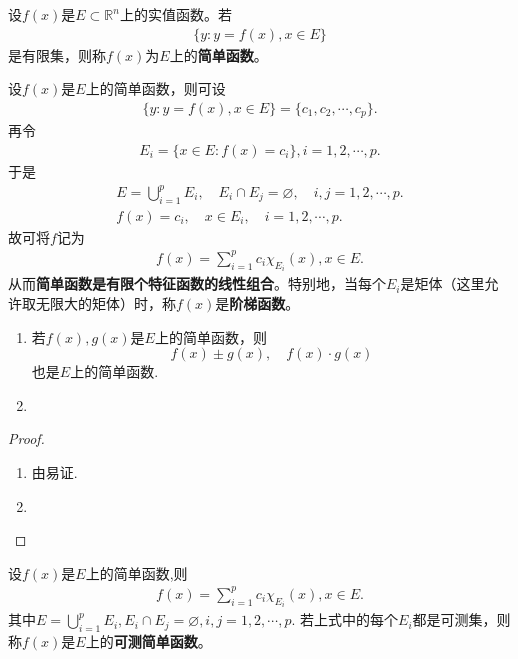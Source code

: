 \documentclass[../../main.tex]{subfiles}
\begin{document}
\begin{definition}[简单函数]
设$f(x)$是$E \subset \mathbb{R}^n$上的实值函数。若
\begin{align*}
\{y: y = f(x), x \in E\}
\end{align*}
是有限集，则称$f(x)$为$E$上的\textbf{简单函数}。
\end{definition}

\begin{theorem}\label{theorem:简单函数是有限个特征函数的线性组合}
设$f(x)$是$E$上的简单函数，则可设
\begin{align*}
\{y:y=f(x),x\in E\}=\{c_1,c_2,\cdots,c_p\}.
\end{align*}
再令
\begin{align*}
E_i=\{x\in E:f(x)=c_i\},i=1,2,\cdots,p.
\end{align*}
于是
\begin{gather*}
E = \bigcup_{i = 1}^{p} E_i, \quad E_i \cap E_j = \varnothing, \quad i, j = 1, 2, \cdots, p. \\
f(x) = c_i, \quad x \in E_i,\quad i = 1, 2, \cdots, p.
\end{gather*}
故可将$f$记为
\begin{align*}
f(x) = \sum_{i = 1}^{p} c_i \chi_{E_i}(x),x \in E.
\end{align*}
从而\textbf{简单函数是有限个特征函数的线性组合}。特别地，当每个$E_i$是矩体（这里允许取无限大的矩体）时，称$f(x)$是\textbf{阶梯函数}。 
\end{theorem}

\begin{proposition}\label{proposition:简单函数的性质}
\begin{enumerate}
\item 若$f(x),g(x)$是$E$上的简单函数，则$$f(x) \pm g(x),\quad f(x) \cdot g(x)$$
也是$E$上的简单函数.

\item 
\end{enumerate}
\end{proposition}
\begin{proof}
\begin{enumerate}
\item 由易证.

\item 
\end{enumerate}
\end{proof}

\begin{definition}[可测简单函数]
设$f(x)$是$E$上的简单函数,则
\begin{align*}
f(x)= \sum_{i = 1}^{p} c_i \chi_{E_i}(x),x \in E.
\end{align*}
其中$E = \bigcup_{i = 1}^{p} E_i,  E_i \cap E_j = \varnothing, i, j = 1, 2, \cdots, p.$
若上式中的每个$E_i$都是可测集，则称$f(x)$是$E$上的\textbf{可测简单函数}。
\end{definition}
\end{document}
